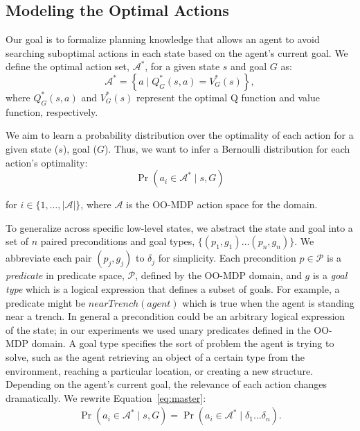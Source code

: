 \documentclass[letterpaper]{article}
\begin{document}
\subsection{Modeling the Optimal Actions}

Our goal is to formalize planning knowledge that allows an agent to
avoid searching suboptimal actions in each state based on the agent's
current goal. We define the optimal action set, $\mathcal{A}^*$, for a
given state $s$ and goal $G$ as:
\begin{equation}
\mathcal{A}^* = \left\{ a \mid Q^*_G(s,a) = V^*_G(s) \right\}, 
\label{eq:opt_act_set}
\end{equation}
where $Q^*_G(s,a)$ and $V^*_G(s)$ represent the optimal Q function and 
value function, respectively.

We aim to learn a probability distribution over the optimality of each action
for a given state ($s$), goal ($G$). Thus, we want to infer a Bernoulli
distribution for each action's optimality:
\begin{equation}
\Pr(a_i \in \mathcal{A}^* \mid s, G)
\label{eq:master}
\end{equation}

\noindent for $i \in \{1, \ldots, |\mathcal{A}|\}$, where
$\mathcal{A}$ is the OO-MDP action space for the domain.

To generalize across specific low-level states, we abstract the state
and goal into a set of $n$ paired preconditions and goal types, $\{
(p_1, g_1) \ldots (p_{n}, g_{n}) \}$. We abbreviate each pair $(p_j,
g_j)$ to $\delta_j$ for simplicity. Each precondition $p \in
\mathcal{P}$ is a {\it predicate} in predicate space, $\mathcal{P}$,
defined by the OO-MDP domain, and $g$ is a {\it goal type} which is a
logical expression that defines a subset of goals. For example, a
predicate might be $nearTrench(agent)$ which is true when the agent is
standing near a trench.  In general a precondition could be an arbitrary
logical expression of the state; in our experiments we used unary
predicates defined in the OO-MDP domain.  A goal type specifies the
sort of problem the agent is trying to solve, such as the agent
retrieving an object of a certain type from the environment, reaching
a particular location, or creating a new structure.  Depending on the
agent's current goal, the relevance of each action changes
dramatically.  We rewrite Equation~\ref{eq:master}:
\begin{multline}
\Pr(a_i \in \mathcal{A}^* \mid s, G)
= \Pr(a_i \in \mathcal{A}^* \mid \delta_1 \ldots \delta_n).
\end{multline}
\end{document}
